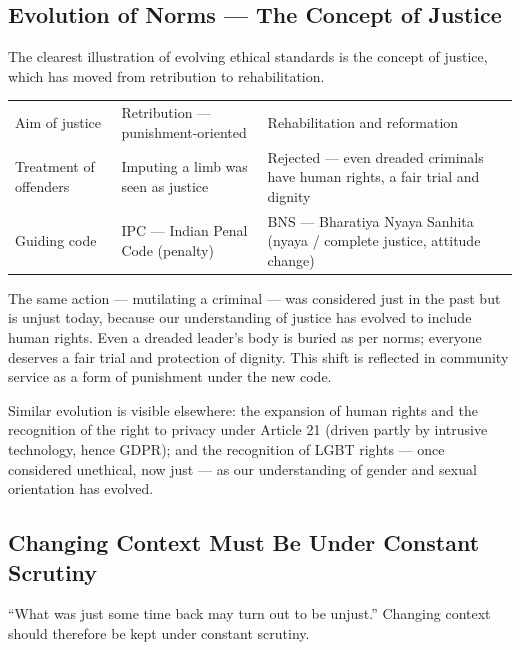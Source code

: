 \subsection{Evolution of Norms --- The Concept of Justice}

The clearest illustration of evolving ethical standards is the concept of justice, which has moved from retribution to rehabilitation.

\begin{center}
\begin{tabularx}{\textwidth}{>{\raggedright\arraybackslash}p{2.9cm} Y Y}
 &  &  \\
\toprule
Aim of justice & Retribution --- punishment-oriented & Rehabilitation and reformation \\
Treatment of offenders & Imputing a limb was seen as justice & Rejected --- even dreaded criminals have human rights, a fair trial and dignity \\
Guiding code & IPC --- Indian Penal Code (penalty) & BNS --- Bharatiya Nyaya Sanhita (nyaya / complete justice, attitude change) \\
\bottomrule
\end{tabularx}
\end{center}

\begin{CriticalPoint}
The same action --- mutilating a criminal --- was considered just in the past but is unjust today, because our understanding of justice has evolved to include human rights. Even a dreaded leader's body is buried as per norms; everyone deserves a fair trial and protection of dignity. This shift is reflected in community service as a form of punishment under the new code.
\end{CriticalPoint}

Similar evolution is visible elsewhere: the expansion of human rights and the recognition of the right to privacy under Article 21 (driven partly by intrusive technology, hence GDPR); and the recognition of LGBT rights --- once considered unethical, now just --- as our understanding of gender and sexual orientation has evolved.

\subsection{Changing Context Must Be Under Constant Scrutiny}

\begin{PYQLink}
``What was just some time back may turn out to be unjust.'' Changing context should therefore be kept under constant scrutiny.
\end{PYQLink}

